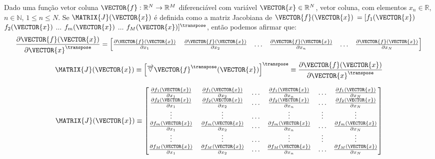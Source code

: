 \begin{proposition}\label{def:jacobian}
 Dado uma função vetor coluna $\VECTOR{f}:\mathbb{R}^{N}\rightarrow \mathbb{R}^{M}$ 
diferenciável com variável $\VECTOR{x} \in \mathbb{R}^{N}$, vetor coluna,
com elementos $x_n\in \mathbb{R}$, $n\in \mathbb{N}$, $1 \leq n \leq N$.
 Se $\MATRIX{J}(\VECTOR{x})$ é definida como a matriz Jacobiana \cite[pp. 130]{zhang2017matrix} \cite{Jacobian}  de 
 $\VECTOR{f}(\VECTOR{x})$
$=[f_1(\VECTOR{x})$ $f_2(\VECTOR{x})$ $\dots$ $f_m(\VECTOR{x})$ $\dots$ $f_M(\VECTOR{x})]^{\transpose}$, 
então podemos afirmar que: 
 \begin{equation}
   \frac{\partial \VECTOR{f}(\VECTOR{x})}{\partial \VECTOR{x}^{\transpose} }=
\left[
\begin{matrix}
\frac{\partial \VECTOR{f}(\VECTOR{x}) }{\partial x_{1}}&
\frac{\partial \VECTOR{f}(\VECTOR{x}) }{\partial x_{2}}&
\hdots&
\frac{\partial \VECTOR{f}(\VECTOR{x}) }{\partial x_{n}}&
\hdots&
\frac{\partial \VECTOR{f}(\VECTOR{x}) }{\partial x_{N}}
\end{matrix}
\right]
 \end{equation}

\begin{equation}
\MATRIX{J}(\VECTOR{x})\equiv
\left[\overrightarrow{\triangledown} \VECTOR{f}^{\transpose}(\VECTOR{x})\right]^{\transpose} \equiv 
\frac{\partial \VECTOR{f}(\VECTOR{x})}{\partial \VECTOR{x}^{\transpose} }
\end{equation}

  \begin{equation}
  \MATRIX{J}(\VECTOR{x})\equiv 
\left[
\begin{matrix}
\frac{\partial f_1(\VECTOR{x}) }{\partial x_{1}}&
\frac{\partial f_1(\VECTOR{x}) }{\partial x_{2}}&
\hdots&
\frac{\partial f_1(\VECTOR{x}) }{\partial x_{n}}&
\hdots&
\frac{\partial f_1(\VECTOR{x}) }{\partial x_{N}}\\
\frac{\partial f_2(\VECTOR{x}) }{\partial x_{1}}&
\frac{\partial f_2(\VECTOR{x}) }{\partial x_{2}}&
\hdots&
\frac{\partial f_2(\VECTOR{x}) }{\partial x_{n}}&
\hdots&
\frac{\partial f_2(\VECTOR{x}) }{\partial x_{N}}\\
\vdots&
\vdots&
\hdots&
\vdots&
\vdots&
\vdots\\
\frac{\partial f_m(\VECTOR{x}) }{\partial x_{1}}&
\frac{\partial f_m(\VECTOR{x}) }{\partial x_{2}}&
\hdots&
\frac{\partial f_m(\VECTOR{x}) }{\partial x_{n}}&
\hdots&
\frac{\partial f_m(\VECTOR{x}) }{\partial x_{N}}\\
\vdots&
\vdots&
\hdots&
\vdots&
\vdots&
\vdots\\
\frac{\partial f_M(\VECTOR{x}) }{\partial x_{1}}&
\frac{\partial f_M(\VECTOR{x}) }{\partial x_{2}}&
\hdots&
\frac{\partial f_M(\VECTOR{x}) }{\partial x_{n}}&
\hdots&
\frac{\partial f_M(\VECTOR{x}) }{\partial x_{N}}\\
\end{matrix}
\right]
 \end{equation}
\end{proposition}


